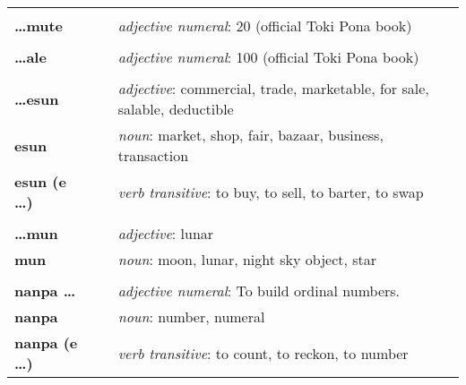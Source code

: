 \begin{supertabular}{p{2,5cm}|ll}
                             &  &                                                                                  \\ %
    \textbf{\dots mute}      &  & \textit{adjective numeral}: 20 (official Toki Pona book)                         \\ %
                             &  &                                                                                  \\ %
    \textbf{\dots ale}       &  & \textit{adjective numeral}: 100 (official Toki Pona book)                        \\ %
                             &  &                                                                                  \\ %
    \textbf{\dots esun}      &  & \textit{adjective}: commercial, trade, marketable, for sale, salable, deductible \\  %
    \textbf{esun}            &  & \textit{noun}: market, shop, fair, bazaar, business, transaction                 \\ %
    \textbf{esun (e \dots)}  &  & \textit{verb transitive}: to buy, to sell, to barter, to swap                    \\ %
                             &  &                                                                                  \\ %
    \textbf{\dots mun}       &  & \textit{adjective}: lunar                                                        \\ %
    \textbf{mun}             &  & \textit{noun}: moon, lunar, night sky object, star                               \\ %
                             &  &                                                                                  \\ %
    \textbf{nanpa \dots}     &  & \textit{adjective numeral}: To build ordinal numbers.                            \\ %
    \textbf{nanpa}           &  & \textit{noun}: number, numeral                                                   \\ %
    \textbf{nanpa (e \dots)} &  & \textit{verb transitive}: to count, to reckon,  to number                        \\ %

\end{supertabular}
